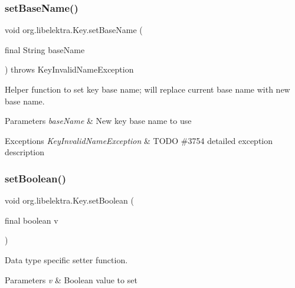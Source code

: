 \subsubsection{\texorpdfstring{set\+Base\+Name()}{setBaseName()}}
{\footnotesize\ttfamily void org.\+libelektra.\+Key.\+set\+Base\+Name (\begin{DoxyParamCaption}\item[{final String}]{base\+Name }\end{DoxyParamCaption}) throws Key\+Invalid\+Name\+Exception\hspace{0.3cm}{\ttfamily [inline]}}



Helper function to set key base name; will replace current base name with new base name. 


\begin{DoxyParams}{Parameters}
{\em base\+Name} & New key base name to use \\
\hline
\end{DoxyParams}

\begin{DoxyExceptions}{Exceptions}
{\em Key\+Invalid\+Name\+Exception} & T\+O\+DO \#3754 detailed exception description \\
\hline
\end{DoxyExceptions}
\mbox{\label{classorg_1_1libelektra_1_1Key_a005125c24abc41a799d73d09c8c148f1}} 
\subsubsection{\texorpdfstring{set\+Boolean()}{setBoolean()}}
{\footnotesize\ttfamily void org.\+libelektra.\+Key.\+set\+Boolean (\begin{DoxyParamCaption}\item[{final boolean}]{v }\end{DoxyParamCaption})\hspace{0.3cm}{\ttfamily [inline]}}



Data type specific setter function. 


\begin{DoxyParams}{Parameters}
{\em v} & Boolean value to set \\
\hline
\end{DoxyParams}
\mbox{\label{classorg_1_1libelektra_1_1Key_ab9576c2e1e526ee23904a50b02386b45}} 

